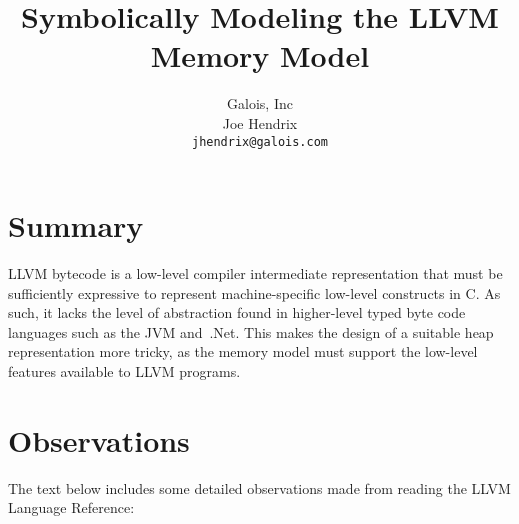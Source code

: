 \documentclass{article}
\title{Symbolically Modeling the LLVM Memory Model}
\author{Galois, Inc\\Joe Hendrix\\\texttt{jhendrix@galois.com}}
\begin{document}
\maketitle{}

\section{Summary}

LLVM bytecode is a low-level compiler intermediate representation that must
be sufficiently expressive to represent machine-specific low-level constructs
in C.  As such, it lacks the level of abstraction found in higher-level
typed byte code languages such as the JVM and~.Net.  This makes the design
of a suitable heap representation more tricky, as the memory model must
support the low-level features available to LLVM programs.

\section{Observations}

The text below includes some detailed observations made from reading
the LLVM Language Reference:
\end{document}
